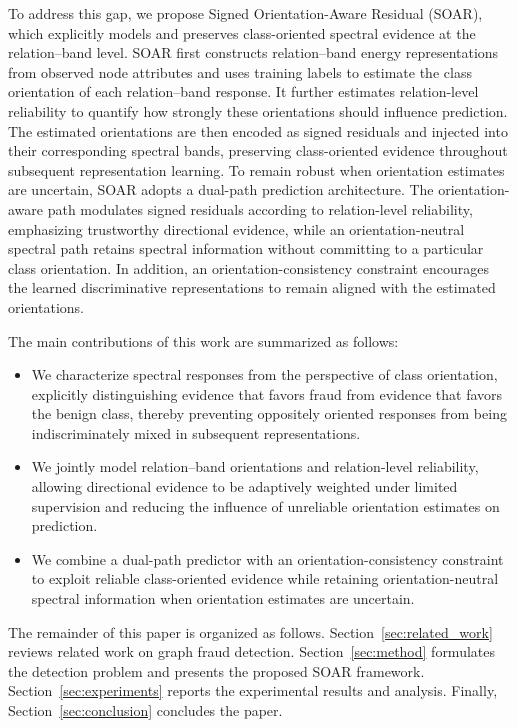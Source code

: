 \documentclass[10pt,journal]{IEEEtran}
\begin{document}
To address this gap, we propose Signed Orientation-Aware Residual (SOAR), which explicitly models and preserves class-oriented spectral evidence at the relation--band level. SOAR first constructs relation--band energy representations from observed node attributes and uses training labels to estimate the class orientation of each relation--band response. It further estimates relation-level reliability to quantify how strongly these orientations should influence prediction. The estimated orientations are then encoded as signed residuals and injected into their corresponding spectral bands, preserving class-oriented evidence throughout subsequent representation learning. To remain robust when orientation estimates are uncertain, SOAR adopts a dual-path prediction architecture. The orientation-aware path modulates signed residuals according to relation-level reliability, emphasizing trustworthy directional evidence, while an orientation-neutral spectral path retains spectral information without committing to a particular class orientation. In addition, an orientation-consistency constraint encourages the learned discriminative representations to remain aligned with the estimated orientations.

The main contributions of this work are summarized as follows:

\begin{itemize}
\item
We characterize spectral responses from the perspective of class orientation, explicitly distinguishing evidence that favors fraud from evidence that favors the benign class, thereby preventing oppositely oriented responses from being indiscriminately mixed in subsequent representations.

\item 
We jointly model relation--band orientations and relation-level reliability, allowing directional evidence to be adaptively weighted under limited supervision and reducing the influence of unreliable orientation estimates on prediction.

\item 
We combine a dual-path predictor with an orientation-consistency constraint to exploit reliable class-oriented evidence while retaining orientation-neutral spectral information when orientation estimates are uncertain.

\end{itemize}
The remainder of this paper is organized as follows.
Section~\ref{sec:related_work} reviews related work on graph fraud detection.
Section~\ref{sec:method} formulates the detection problem and presents the proposed SOAR framework.
Section~\ref{sec:experiments} reports the experimental results and analysis.
Finally, Section~\ref{sec:conclusion} concludes the paper.
\end{document}
